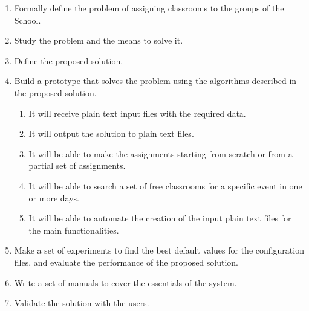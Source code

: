 \begin{enumerate}

    \item Formally define the problem of assigning classrooms to the groups of the School.

    \item Study the problem and the means to solve it.

    \item Define the proposed solution.

    \item Build a prototype that solves the problem using the algorithms described in the proposed solution.

        \begin{enumerate}

            \item It will receive plain text input files with the required data.

            \item It will output the solution to plain text files.

            \item It will be able to make the assignments starting from scratch or from a partial set of assignments.

            \item It will be able to search a set of free classrooms for a specific event in one or more days.

            \item It will be able to automate the creation of the input plain text files for the main functionalities.

        \end{enumerate}

    \item Make a set of experiments to find the best default values for the configuration files, and evaluate the performance of the proposed solution.

    \item Write a set of manuals to cover the essentials of the system.

    \item Validate the solution with the users.

\end{enumerate}

